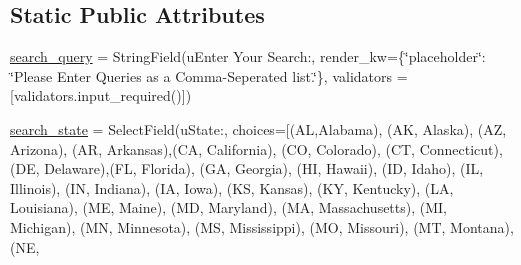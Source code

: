 \subsection*{Static Public Attributes}
\begin{DoxyCompactItemize}
\item 
\mbox{\hyperlink{classserver_1_1server_1_1_input_form_ab4f0118c5e7a7ecc3ca50d7f781f2de2}{search\+\_\+query}} = String\+Field(u\textquotesingle{}Enter Your Search\+:\textquotesingle{}, render\+\_\+kw=\{\char`\"{}placeholder\char`\"{}\+: \char`\"{}Please Enter Queries as a Comma-\/Seperated list.\char`\"{}\}, validators = \mbox{[}validators.\+input\+\_\+required()\mbox{]})
\item 
\mbox{\hyperlink{classserver_1_1server_1_1_input_form_ad899681ccf68ae96f24ae575e3142635}{search\+\_\+state}} = Select\+Field(u\textquotesingle{}State\+:\textquotesingle{}, choices=\mbox{[}(\textquotesingle{}AL\textquotesingle{},\textquotesingle{}Alabama\textquotesingle{}), (\textquotesingle{}AK\textquotesingle{}, \textquotesingle{}Alaska\textquotesingle{}), (\textquotesingle{}AZ\textquotesingle{}, \textquotesingle{}Arizona\textquotesingle{}), (\textquotesingle{}AR\textquotesingle{}, \textquotesingle{}Arkansas\textquotesingle{}),(\textquotesingle{}CA\textquotesingle{}, \textquotesingle{}California\textquotesingle{}), (\textquotesingle{}CO\textquotesingle{}, \textquotesingle{}Colorado\textquotesingle{}), (\textquotesingle{}CT\textquotesingle{}, \textquotesingle{}Connecticut\textquotesingle{}), (\textquotesingle{}DE\textquotesingle{}, \textquotesingle{}Delaware\textquotesingle{}),(\textquotesingle{}FL\textquotesingle{}, \textquotesingle{}Florida\textquotesingle{}), (\textquotesingle{}GA\textquotesingle{}, \textquotesingle{}Georgia\textquotesingle{}), (\textquotesingle{}HI\textquotesingle{}, \textquotesingle{}Hawaii\textquotesingle{}), (\textquotesingle{}ID\textquotesingle{}, \textquotesingle{}Idaho\textquotesingle{}), (\textquotesingle{}IL\textquotesingle{}, \textquotesingle{}Illinois\textquotesingle{}), (\textquotesingle{}IN\textquotesingle{}, \textquotesingle{}Indiana\textquotesingle{}), (\textquotesingle{}IA\textquotesingle{}, \textquotesingle{}Iowa\textquotesingle{}), (\textquotesingle{}KS\textquotesingle{}, \textquotesingle{}Kansas\textquotesingle{}), (\textquotesingle{}KY\textquotesingle{}, \textquotesingle{}Kentucky\textquotesingle{}), (\textquotesingle{}LA\textquotesingle{}, \textquotesingle{}Louisiana\textquotesingle{}), (\textquotesingle{}ME\textquotesingle{}, \textquotesingle{}Maine\textquotesingle{}), (\textquotesingle{}MD\textquotesingle{}, \textquotesingle{}Maryland\textquotesingle{}), (\textquotesingle{}MA\textquotesingle{}, \textquotesingle{}Massachusetts\textquotesingle{}), (\textquotesingle{}MI\textquotesingle{}, \textquotesingle{}Michigan\textquotesingle{}), (\textquotesingle{}MN\textquotesingle{}, \textquotesingle{}Minnesota\textquotesingle{}), (\textquotesingle{}MS\textquotesingle{}, \textquotesingle{}Mississippi\textquotesingle{}), (\textquotesingle{}MO\textquotesingle{}, \textquotesingle{}Missouri\textquotesingle{}), (\textquotesingle{}MT\textquotesingle{}, \textquotesingle{}Montana\textquotesingle{}), (\textquotesingle{}NE\textquotesingle{}, 
\end{DoxyCompactItemize}
